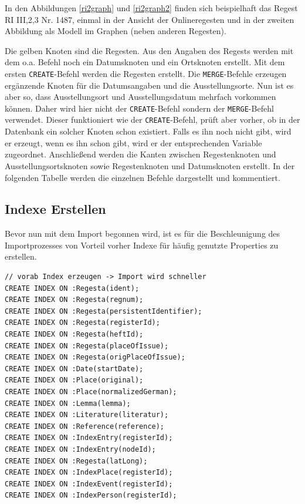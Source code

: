 \documentclass[ngerman,]{scrreprt}
\begin{document}
In den Abbildungen \ref{ri2graph} und \ref{ri2graph2} finden sich beispielhaft das Regest RI III,2,3 Nr. 1487, einmal in der Ansicht der Onlineregesten und in der zweiten Abbildung als Modell im Graphen (neben anderen Regesten).

Die gelben Knoten sind die Regesten. Aus den Angaben des Regests werden mit dem o.a. Befehl noch ein Datumsknoten und ein Ortsknoten erstellt. Mit dem ersten \texttt{CREATE}-Befehl werden die Regesten erstellt. Die \texttt{MERGE}-Befehle erzeugen ergänzende Knoten für die Datumsangaben und die Ausstellungsorte. Nun ist es aber so, dass Ausstellungsort und Ausstellungsdatum mehrfach vorkommen können. Daher wird hier nicht der \texttt{CREATE}-Befehl sondern der \texttt{MERGE}-Befehl verwendet. Dieser funktioniert wie der \texttt{CREATE}-Befehl, prüft aber vorher, ob in der Datenbank ein solcher Knoten schon existiert. Falls es ihn noch nicht gibt, wird er erzeugt, wenn es ihn schon gibt, wird er der entsprechenden Variable zugeordnet. Anschließend werden die Kanten zwischen Regestenknoten und Ausstellungsortsknoten sowie Regestenknoten und Datumsknoten erstellt. In der folgenden Tabelle werden die einzelnen Befehle dargestellt und kommentiert.

\hypertarget{indexe-erstellen}{%
\subsection{Indexe Erstellen}\label{indexe-erstellen}}

Bevor nun mit dem Import begonnen wird, ist es für die Beschleunigung des Importprozesses von Vorteil vorher Indexe für häufig genutzte Properties zu erstellen.

\begin{verbatim}
// vorab Index erzeugen -> Import wird schneller
CREATE INDEX ON :Regesta(ident);
CREATE INDEX ON :Regesta(regnum);
CREATE INDEX ON :Regesta(persistentIdentifier);
CREATE INDEX ON :Regesta(registerId);
CREATE INDEX ON :Regesta(heftId);
CREATE INDEX ON :Regesta(placeOfIssue);
CREATE INDEX ON :Regesta(origPlaceOfIssue);
CREATE INDEX ON :Date(startDate);
CREATE INDEX ON :Place(original);
CREATE INDEX ON :Place(normalizedGerman);
CREATE INDEX ON :Lemma(lemma);
CREATE INDEX ON :Literature(literatur);
CREATE INDEX ON :Reference(reference);
CREATE INDEX ON :IndexEntry(registerId);
CREATE INDEX ON :IndexEntry(nodeId);
CREATE INDEX ON :Regesta(latLong);
CREATE INDEX ON :IndexPlace(registerId);
CREATE INDEX ON :IndexEvent(registerId);
CREATE INDEX ON :IndexPerson(registerId);
\end{verbatim}
\end{document}
